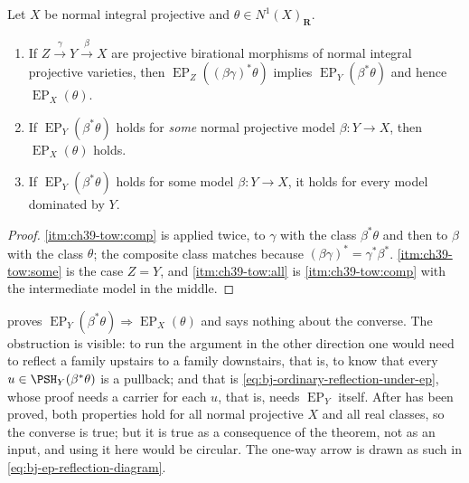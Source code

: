 \begin{corollary}
\label{cor:ch39-ep-tower}
Let $X$ be normal integral projective and $\theta\in N^1(X)_{\mathbf R}$.
\begin{enumerate}
\item\label{itm:ch39-tow:comp} If $Z\xrightarrow{\ \gamma\ }Y
 \xrightarrow{\ \beta\ }X$ are projective birational morphisms of normal
 integral projective varieties, then
 $\operatorname{EP}_Z((\beta\gamma)^*\theta)$ implies
 $\operatorname{EP}_Y(\beta^*\theta)$ and hence
 $\operatorname{EP}_X(\theta)$.
\item\label{itm:ch39-tow:some} If $\operatorname{EP}_Y(\beta^*\theta)$
 holds for \emph{some} normal projective model $\beta:Y\to X$, then
 $\operatorname{EP}_X(\theta)$ holds.
\item\label{itm:ch39-tow:all} If $\operatorname{EP}_Y(\beta^*\theta)$
 holds for some model $\beta:Y\to X$, it holds for every model dominated
 by $Y$.
\end{enumerate}
\end{corollary}

\begin{proof}
\cref{itm:ch39-tow:comp} is  applied
twice, to $\gamma$ with the class $\beta^*\theta$ and then to
$\beta$ with the class $\theta$; the composite class matches because
$(\beta\gamma)^*=\gamma^*\beta^*$.  \cref{itm:ch39-tow:some} is the case
$Z=Y$, and \cref{itm:ch39-tow:all} is \cref{itm:ch39-tow:comp} with the
intermediate model in the middle.
\end{proof}

\begin{remark}
\label{rem:ch39-one-way}
 proves
$\operatorname{EP}_Y(\beta^*\theta)\Rightarrow\operatorname{EP}_X(\theta)$
and says nothing about the converse.  The obstruction is visible: to run the
argument in the other direction one would need to reflect a family upstairs
to a family downstairs, that is, to know that every
$u\in\PSH_Y(\beta^*\theta)$ is a pullback; and that is
\eqref{eq:bj-ordinary-reflection-under-ep}, whose proof needs a carrier for
each $u$, that is, needs $\operatorname{EP}_Y$ itself.  After
 has been proved, both properties hold for all
normal projective $X$ and all real classes, so the converse is true; but
it is true as a consequence of the theorem, not as an input, and using it
here would be circular.  The one-way arrow is drawn as such in
\eqref{eq:bj-ep-reflection-diagram}.
\end{remark}

